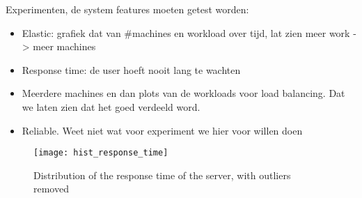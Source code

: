 Experimenten, de system features moeten getest worden:

\begin{itemize}
	\item Elastic: grafiek dat van \#machines en workload over tijd, lat zien meer work -> meer machines
	\item Response time: de user hoeft nooit lang te wachten
	\item Meerdere machines en dan plots van de workloads voor load balancing. Dat we laten zien dat het goed verdeeld word.
	\item Reliable. Weet niet wat voor experiment we hier voor willen doen
\end{itemize}

\begin{figure}[H]
	\texttt{[image: hist\_response\_time]}
	\caption{Distribution of the response time of the server, with outliers removed}
	\label{fig:exp:response}
\end{figure}
